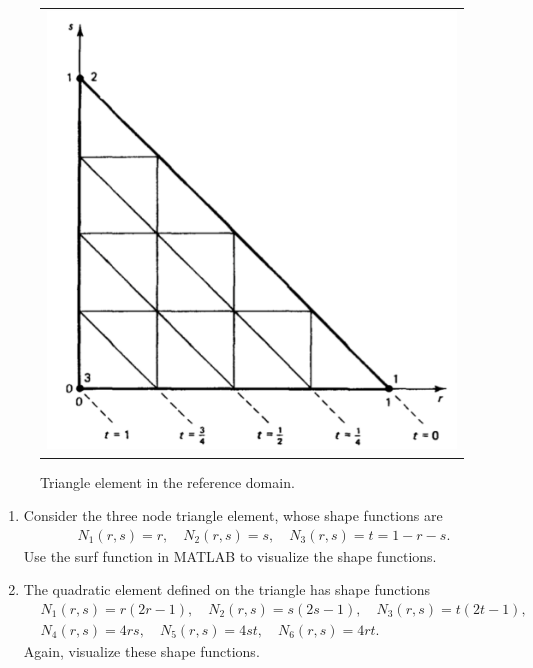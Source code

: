 \documentclass[12pt]{article}
\begin{document}
\begin{enumerate}
\begin{figure}[h]
	\begin{center}
	\begin{tabular}{c}
\includegraphics[angle=0, trim=0 0 0 0, clip=true, scale = 0.35]{./triangle_elem.pdf}
\end{tabular}
\end{center} 
\caption{Triangle element in the reference domain.}
\label{fig:tri}
\end{figure}

\begin{enumerate}
\item Consider the three node triangle element, whose shape functions are 
\begin{align*}
N_1(r,s) = r, \quad N_2(r,s) = s, \quad N_3(r,s) = t = 1 - r - s.
\end{align*}
Use the surf function in MATLAB to visualize the shape functions.

\item The quadratic element defined on the triangle has shape functions
\begin{align*}
& N_1(r,s) = r(2r-1), \quad N_2(r,s) = s(2s-1), \quad N_3(r,s) = t(2t-1), \\
& N_4(r,s) = 4rs, \quad N_5(r,s) = 4st, \quad N_6(r,s) = 4rt.
\end{align*}
Again, visualize these shape functions.


\end{enumerate}
\end{enumerate}
\end{document}
